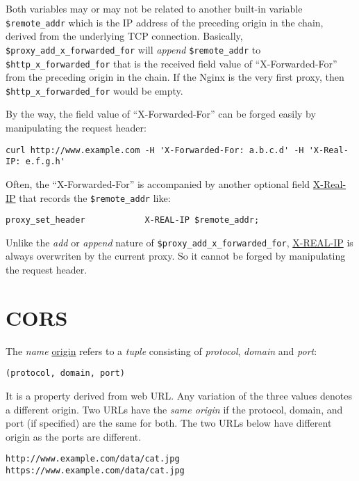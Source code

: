 Both variables may or may not be related to another built-in
variable \lstinline|$remote_addr| which is the IP address of the
preceding origin in the chain, derived from the underlying TCP
connection. Basically,
\lstinline|$proxy_add_x_forwarded_for| will \textit{append}
\lstinline|$remote_addr| to
\lstinline|$http_x_forwarded_for| that is the received field value
of ``X-Forwarded-For'' from the preceding origin in the chain. If
the Nginx is the very first proxy, then
\lstinline|$http_x_forwarded_for| would be empty.

By the way, the field value of ``X-Forwarded-For'' can be forged
easily by manipulating the request header:

\begin{lstlisting}
curl http://www.example.com -H 'X-Forwarded-For: a.b.c.d' -H 'X-Real-IP: e.f.g.h'
\end{lstlisting}

Often, the ``X-Forwarded-For'' is accompanied by another optional
field \uline{X-Real-IP} that records the
\lstinline|$remote_addr| like:

\begin{lstlisting}
proxy_set_header            X-REAL-IP $remote_addr;
\end{lstlisting}

Unlike the \textit{add} or \textit{append} nature of
\lstinline|$proxy_add_x_forwarded_for|, \uline{X-REAL-IP} is
always overwriten by the current proxy. So it cannot be forged by
manipulating the request header.

\section{CORS}
\label{sec:cors}

The \textit{name} \uline{origin} refers to a \textit{tuple}
consisting of \textit{protocol}, \textit{domain} and
\textit{port}:

\begin{lstlisting}
(protocol, domain, port)
\end{lstlisting}

It is a property derived from web URL. Any variation of the three
values denotes a different origin. Two URLs have the \textit{same
  origin} if the protocol, domain, and port (if specified) are the
same for both. The two URLs below have different origin as the
ports are different.

\begin{lstlisting}
http://www.example.com/data/cat.jpg
https://www.example.com/data/cat.jpg
\end{lstlisting}

